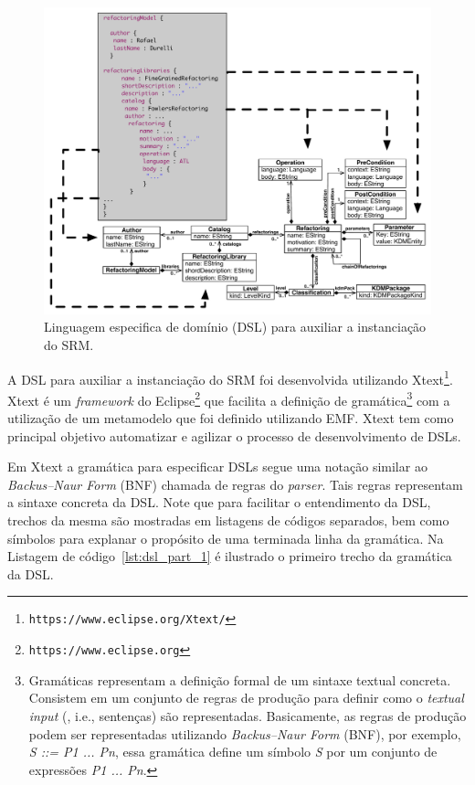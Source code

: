 \begin{figure}[h]
	\centering
	\includegraphics[scale=0.6]{images/DSLEMEtamodel}
	\caption{Linguagem especifica de domínio (DSL) para auxiliar a instanciação do SRM.}
	\label{fig:DSL_SRM}
\end{figure}

A DSL para auxiliar a instanciação do SRM foi desenvolvida utilizando Xtext\footnote{\texttt{https://www.eclipse.org/Xtext/}}. Xtext é um \textit{framework} do Eclipse\footnote{\texttt{https://www.eclipse.org}} que facilita a definição de gramática\footnote{Gramáticas representam a definição formal de um sintaxe textual concreta. Consistem em um conjunto de regras de produção para definir como o \textit{textual input} (, i.e., sentenças) são representadas. Basicamente, as regras de produção podem ser representadas utilizando \textit{Backus–Naur Form} (BNF), por exemplo, \textit{S ::= P1 ... Pn}, essa gramática define um símbolo \textit{S} por um conjunto de expressões \textit{P1 ... Pn}.} 
com a utilização de um metamodelo que foi definido utilizando EMF. Xtext tem como principal objetivo automatizar e agilizar o processo de desenvolvimento de DSLs.

 Em Xtext a gramática para especificar DSLs segue uma notação similar ao \textit{Backus–Naur Form} (BNF) chamada de regras do \textit{parser}. Tais regras representam a sintaxe concreta da DSL. Note que para facilitar o entendimento da DSL, trechos da mesma são mostradas em listagens de códigos separados, bem como símbolos para explanar o propósito de uma terminada linha da gramática. Na Listagem de código~\ref{lst:dsl_part_1} é ilustrado o primeiro trecho da gramática da DSL. 

